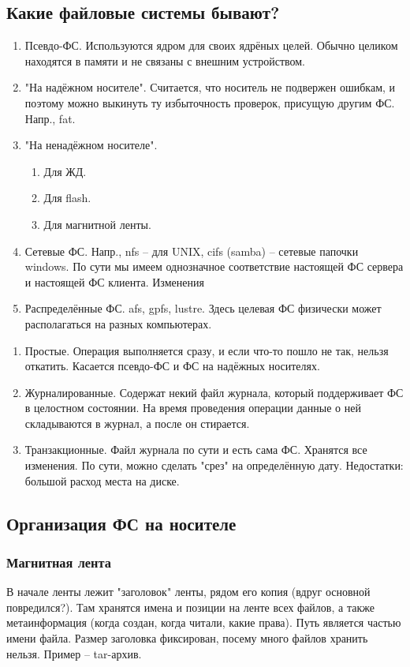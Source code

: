 \documentclass[a4paper,10pt]{article}
\begin{document}
\subsection{Какие файловые системы бывают?}
\begin{enumerate}
 \item Псевдо-ФС. Используются ядром для своих ядрёных целей. Обычно целиком находятся в памяти и не связаны с внешним устройством.
 \item "На надёжном носителе". Считается, что носитель не подвержен ошибкам, и поэтому можно выкинуть ту избыточность проверок, присущую другим ФС. Напр., fat.
 \item "На ненадёжном носителе". 
 \begin{enumerate}
  \item Для ЖД.
  \item Для flash.
  \item Для магнитной ленты.
 \end{enumerate}
 \item Сетевые ФС. Напр., nfs -- для UNIX, cifs (samba) -- сетевые папочки windows.
 По сути мы имеем однозначное соответствие настоящей ФС сервера и настоящей ФС клиента. Изменения 
 \item Распределённые ФС. afs, gpfs, lustre. 
 Здесь целевая ФС физически может располагаться на разных компьютерах.
\end{enumerate}
\begin{enumerate}
 \item Простые. Операция выполняется сразу, и если что-то пошло не так, нельзя откатить. Касается псевдо-ФС и ФС на надёжных носителях.
 \item Журналированные. Содержат некий файл журнала, который поддерживает ФС в целостном состоянии. На время проведения операции данные о ней складываются в журнал, а после он стирается.
 \item Транзакционные. Файл журнала по сути и есть сама ФС. Хранятся все изменения. По сути, можно сделать "срез" на определённую дату. Недостатки: большой расход места на диске.
\end{enumerate}

\subsection{Организация ФС на носителе}

\subsubsection{Магнитная лента}
В начале ленты лежит "заголовок" ленты, рядом его копия (вдруг основной повредился?). Там хранятся имена и позиции на ленте всех файлов, а также метаинформация (когда создан, когда читали, какие права). Путь является частью имени файла. Размер заголовка фиксирован, посему много файлов хранить нельзя. Пример -- tar-архив.
\end{document}
